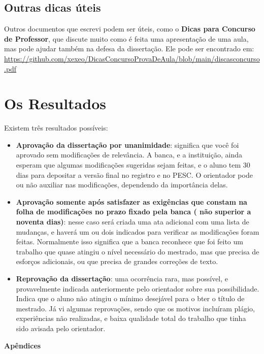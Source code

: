 \documentclass[a4paper,12pt]{article}
\begin{document}
\subsection{Outras dicas úteis}

Outros documentos que escrevi podem ser úteis, como o \textbf{Dicas para Concurso de Professor}, que discute muito como é feita uma apresentação de uma aula, mas pode ajudar também na defesa da dissertação. Ele pode ser encontrado em:  \url{https://github.com/xexeo/DicasConcursoProvaDeAula/blob/main/discasconcurso.pdf}

\section{Os Resultados}

Existem três resultados possíveis:
\begin{itemize}
    \item \textbf{Aprovação da dissertação por unanimidade}: significa que você foi aprovado sem modificações de relevância. A banca, e a instituição, ainda esperam que algumas modificações sugeridas sejam feitas, e o aluno tem 30 dias para depositar a versão final no registro e no PESC. O orientador pode ou não auxiliar nas modificações, dependendo da importância delas.
    \item \textbf{Aprovação  somente  após  satisfazer  as  exigências que constam 	 na  folha  de   modificações  no  prazo   fixado  pela  banca    ( não superior  a   noventa   dias)}: nesse caso será criada uma ata adicional com uma lista de mudanças, e haverá um ou dois indicados para verificar as modificações foram feitas. Normalmente isso significa que a banca reconhece que foi feito um trabalho que quase atingiu o nível necessário do mestrado, mas que precisa de esforços adicionais, ou que precisa de grandes correções de texto.
    \item \textbf{Reprovação da dissertação}: uma ocorrência rara, mas possível, e provavelmente indicada anteriormente pelo orientador sobre sua possibilidade. Indica que o aluno não atingiu o mínimo desejável para o bter o título de mestrado. Já vi algumas reprovações, sendo que os motivos incluíram plágio, experiências não realizadas, e baixa qualidade total do trabalho que tinha sido avisada pelo orientador.
\end{itemize}



\clearpage
\begin{center}
  \sffamily\Huge\bfseries
  Apêndices
\end{center}
\end{document}
